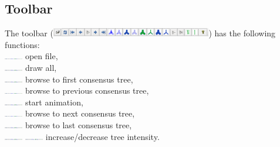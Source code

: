 \documentclass{article}
\begin{document}
\subsection{Toolbar}
The toolbar (\includegraphics[width=7cm]{toolbar.png}) has the following functions:\\
\includegraphics[width=8mm,viewport=0 0 28 28,clip]{toolbar.png} open file,\\
\includegraphics[width=8mm,viewport=28 0 52 28,clip]{toolbar.png} draw all,\\
\includegraphics[width=8mm,viewport=52 0 79 28,clip]{toolbar.png} browse to first consensus tree,\\
\includegraphics[width=8mm,viewport=79 0 105 28,clip]{toolbar.png} browse to previous consensus tree,\\
\includegraphics[width=8mm,viewport=105 0 129 28,clip]{toolbar.png} start animation,\\
\includegraphics[width=8mm,viewport=129 0 155 28,clip]{toolbar.png} browse to next consensus tree,\\
\includegraphics[width=8mm,viewport=155 0 182 28,clip]{toolbar.png} browse to last consensus tree,\\
\includegraphics[width=8mm,viewport=182 0 211 28,clip]{toolbar.png} 
\includegraphics[width=8mm,viewport=211 0 237 28,clip]{toolbar.png} increase/decrease tree intensity.\\
\end{document}
